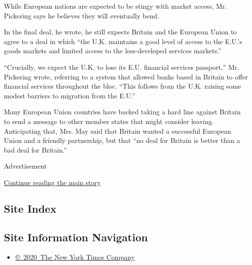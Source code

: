 While European nations are expected to be stingy with market access, Mr.
Pickering says he believes they will eventually bend.

In the final deal, he wrote, he still expects Britain and the European
Union to agree to a deal in which ``the U.K. maintains a good level of
access to the E.U.'s goods markets and limited access to the
less-developed services markets.''

``Crucially, we expect the U.K. to lose its E.U. financial services
passport,'' Mr. Pickering wrote, referring to a system that allowed
banks based in Britain to offer financial services throughout the bloc.
``This follows from the U.K. raising some modest barriers to migration
from the E.U.''

Many European Union countries have backed taking a hard line against
Britain to send a message to other member states that might consider
leaving. Anticipating that, Mrs. May said that Britain wanted a
successful European Union and a friendly partnership, but that ``no deal
for Britain is better than a bad deal for Britain.''

Advertisement

\protect\hyperlink{after-bottom}{Continue reading the main story}

\hypertarget{site-index}{%
\subsection{Site Index}\label{site-index}}

\hypertarget{site-information-navigation}{%
\subsection{Site Information
Navigation}\label{site-information-navigation}}

\begin{itemize}
\tightlist
\item
  \href{https://help.nytimes.com/hc/en-us/articles/115014792127-Copyright-notice}{©~2020~The
  New York Times Company}
\end{itemize}

